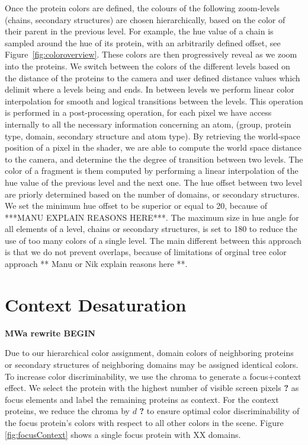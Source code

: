 \documentclass[review,journal]{vgtc}         %
\begin{document}
Once the protein colors are defined, the colours of the following zoom-levels (chains, secondary structures) are chosen hierarchically, based on the color of their parent in the previous level.
For example, the hue value of a chain is sampled around the hue of its protein, with an arbitrarily defined offset, see Figure~\ref{fig:coloroverview}.
These colors are then progressively reveal as we zoom into the proteins.
We switch between the colors of the different levels based on the distance of the proteins to the camera and user defined distance values which delimit where a levels being and ends.
In between levels we perform linear color interpolation for smooth and logical transitions between the levels.
This operation is performed in a post-processing operation, for each pixel we have access internally to all the necessary  information concerning an atom, (group, protein type, domain, secondary structure and atom type).
By retrieving the world-space position of a pixel in the shader, we are able to compute the world space distance to the camera, and determine the the degree of transition between two levels.
The color of a fragment is them computed by performing a linear interpolation of the hue value of the previous level and the next one. 
The hue offset between two level are priorly determined based on the number of domains, or secondary structures.
We set the minimum hue offset to be superior or equal to 20, because of ***MANU EXPLAIN REASONS HERE***.
The maximum size in hue angle for all elements of a level, chains or secondary structures, is set to 180 to reduce the use of too many colors of a single level.
The main different between this approach is that we do not prevent overlaps, because of limitations of orginal tree color approach ** Manu or Nik explain reasons here **.


\section{Context Desaturation}

\textbf{MWa rewrite BEGIN}

Due to our hierarchical color assignment, domain colors of neighboring proteins or secondary structures of neighboring domains may be assigned identical colors. 
To increase color discriminability, we use the chroma to generate a focus+context effect. 
We select the protein with the highest number of visible screen pixels \textbf{?} as focus elements and label the remaining proteins as context. 
For the context proteins, we reduce the chroma by $d$ \textbf{?} to ensure optimal color discriminability of the focus protein's colors with respect to all other colors in the scene. 
Figure \ref{fig:focusContext} shows a single focus protein with XX domains. 
\end{document}
